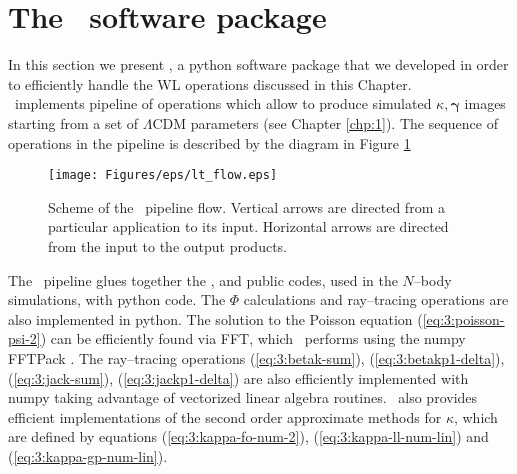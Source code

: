 
\section{The \LT\, software package}
\label{sec:3:lt}
In this section we present \LT \citep{lenstools}, a {\sc python} software package that we developed in order to efficiently handle the WL operations discussed in this Chapter. \\ \LT\, implements pipeline of operations which allow to produce simulated $\kappa,\pmb{\gamma}$ images starting from a set of $\Lambda$CDM parameters (see Chapter \ref{chp:1}). The sequence of operations in the pipeline is described by the diagram in Figure \ref{fig:3:lt-flow}  
%
\begin{figure}
\begin{center}
\texttt{[image: Figures/eps/lt\_flow.eps]}
\end{center}
\caption{Scheme of the \LT\, pipeline flow. Vertical arrows are directed from a particular application to its input. Horizontal arrows are directed from the input to the output products.}
\label{fig:3:lt-flow}
\end{figure}
%
The \LT\, pipeline glues together the ,  and  public codes, used in the $N$--body simulations, with {\sc python} code. The $\Phi$ calculations and ray--tracing operations are also implemented in {\sc python}. The solution to the Poisson equation (\ref{eq:3:poisson-psi-2}) can be efficiently found via FFT, which \LT\, performs using the {\sc numpy} FFTPack \citep{scipy}. The ray--tracing operations (\ref{eq:3:betak-sum}), (\ref{eq:3:betakp1-delta}), (\ref{eq:3:jack-sum}), (\ref{eq:3:jackp1-delta}) are also efficiently implemented with {\sc numpy} taking advantage of vectorized linear algebra routines. \LT\, also provides efficient implementations of the second order approximate methods for $\kappa$, which are defined by equations (\ref{eq:3:kappa-fo-num-2}), (\ref{eq:3:kappa-ll-num-lin}) and (\ref{eq:3:kappa-gp-num-lin}). 

